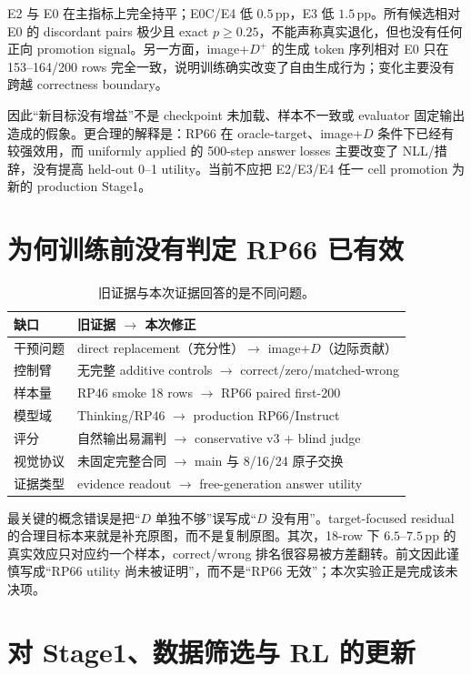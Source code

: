 \documentclass[UTF8,twocolumn,10pt,a4paper]{ctexart}
\newcommand{\Dpos}{D^{+}}
\newcommand{\pp}{\,\mathrm{pp}}
\begin{document}
E2 与 E0 在主指标上完全持平；E0C/E4 低 $0.5\pp$，E3 低 $1.5\pp$。所有候选相对 E0 的 discordant pairs 极少且 exact $p\ge0.25$，不能声称真实退化，但也没有任何正向 promotion signal。另一方面，image+$\Dpos$ 的生成 token 序列相对 E0 只在 153--164/200 rows 完全一致，说明训练确实改变了自由生成行为；变化主要没有跨越 correctness boundary。

因此“新目标没有增益”不是 checkpoint 未加载、样本不一致或 evaluator 固定输出造成的假象。更合理的解释是：RP66 在 oracle-target、image+$D$ 条件下已经有较强效用，而 uniformly applied 的 500-step answer losses 主要改变了 NLL/措辞，没有提高 held-out 0--1 utility。当前不应把 E2/E3/E4 任一 cell promotion 为新的 production Stage1。

\section{为何训练前没有判定 RP66 已有效}

\begin{table}[t]
\centering
\caption{旧证据与本次证据回答的是不同问题。}
\label{tab:why-missed}
\scriptsize
\begin{tabularx}{\columnwidth}{lY}
\toprule
缺口 & 旧证据 $\rightarrow$ 本次修正 \\
\midrule
干预问题 & direct replacement（充分性）$\rightarrow$ image+$D$（边际贡献） \\
控制臂 & 无完整 additive controls $\rightarrow$ correct/zero/matched-wrong \\
样本量 & RP46 smoke 18 rows $\rightarrow$ RP66 paired first-200 \\
模型域 & Thinking/RP46 $\rightarrow$ production RP66/Instruct \\
评分 & 自然输出易漏判 $\rightarrow$ conservative v3 + blind judge \\
视觉协议 & 未固定完整合同 $\rightarrow$ main 与 8/16/24 原子交换 \\
证据类型 & evidence readout $\rightarrow$ free-generation answer utility \\
\bottomrule
\end{tabularx}
\end{table}

最关键的概念错误是把“$D$ 单独不够”误写成“$D$ 没有用”。target-focused residual 的合理目标本来就是补充原图，而不是复制原图。其次，18-row 下 $6.5$--$7.5\pp$ 的真实效应只对应约一个样本，correct/wrong 排名很容易被方差翻转。前文因此谨慎写成“RP66 utility 尚未被证明”，而不是“RP66 无效”；本次实验正是完成该未决项。

\section{对 Stage1、数据筛选与 RL 的更新}
\end{document}
